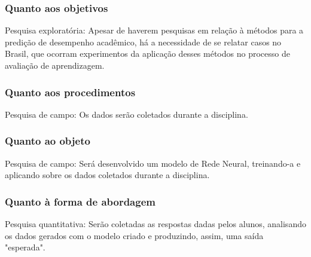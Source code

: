 \documentclass[
	12pt,				%
	openright,			%
	oneside,
	a4paper,			%
	english,			%
	french,				%
	spanish,			%
	brazil,				%
	]{abntex2}
\begin{document}
\subsubsection{Quanto aos objetivos}
Pesquisa exploratória: Apesar de haverem pesquisas em relação à métodos para a predição de desempenho acadêmico, há a necessidade de se relatar casos no Brasil, que ocorram experimentos da aplicação desses métodos no processo de avaliação de aprendizagem.

\subsubsection{Quanto aos procedimentos}
Pesquisa de campo: Os dados serão coletados durante a disciplina.

\subsubsection{Quanto ao objeto}
Pesquisa de campo: Será desenvolvido um modelo de Rede Neural, treinando-a e aplicando sobre os dados coletados durante a disciplina.

\subsubsection{Quanto à forma de abordagem}
Pesquisa quantitativa: Serão coletadas as respostas dadas pelos alunos, analisando os dados gerados com o modelo criado e produzindo, assim, uma saída "esperada".
\end{document}
